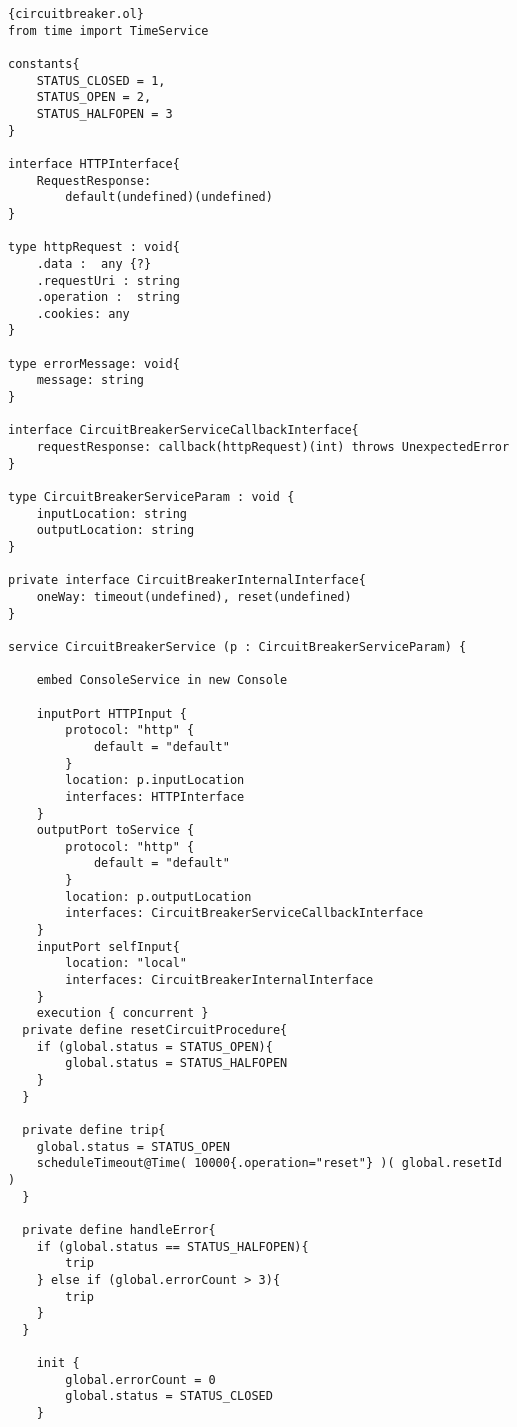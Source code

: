\begin{listing}[ht]
    \lstset{language=Jolie,
        style=codeStyle,
        numbers=left,
        firstnumber=1
    }
    \begin{lstlisting}[frame=tlrb,
basicstyle=\footnotesize]{circuitbreaker.ol}
from time import TimeService

constants{
    STATUS_CLOSED = 1,
    STATUS_OPEN = 2,
    STATUS_HALFOPEN = 3
}

interface HTTPInterface{
    RequestResponse:
        default(undefined)(undefined)
}

type httpRequest : void{
    .data :  any {?}
    .requestUri : string
    .operation :  string
    .cookies: any
}

type errorMessage: void{
    message: string
}

interface CircuitBreakerServiceCallbackInterface{
    requestResponse: callback(httpRequest)(int) throws UnexpectedError
}

type CircuitBreakerServiceParam : void {
    inputLocation: string
    outputLocation: string
}

private interface CircuitBreakerInternalInterface{
    oneWay: timeout(undefined), reset(undefined)
}

service CircuitBreakerService (p : CircuitBreakerServiceParam) {

    embed ConsoleService in new Console

    inputPort HTTPInput {
        protocol: "http" {
            default = "default"
        }
        location: p.inputLocation
        interfaces: HTTPInterface
    }
    outputPort toService {
        protocol: "http" {
            default = "default"
        }
        location: p.outputLocation
        interfaces: CircuitBreakerServiceCallbackInterface
    }
    inputPort selfInput{
        location: "local"
        interfaces: CircuitBreakerInternalInterface
    }
    execution { concurrent }
  private define resetCircuitProcedure{
    if (global.status = STATUS_OPEN){
        global.status = STATUS_HALFOPEN
    }
  }

  private define trip{
    global.status = STATUS_OPEN
    scheduleTimeout@Time( 10000{.operation="reset"} )( global.resetId )
  }

  private define handleError{
    if (global.status == STATUS_HALFOPEN){
        trip
    } else if (global.errorCount > 3){
        trip
    }
  }

    init {
        global.errorCount = 0
        global.status = STATUS_CLOSED
    }


\end{lstlisting}
\end{listing}
